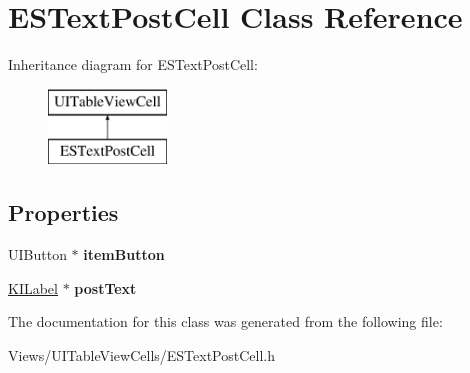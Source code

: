 \hypertarget{interface_e_s_text_post_cell}{}\section{E\+S\+Text\+Post\+Cell Class Reference}
\label{interface_e_s_text_post_cell}
Inheritance diagram for E\+S\+Text\+Post\+Cell\+:\begin{figure}[H]
\begin{center}
\leavevmode
\includegraphics[height=2.000000cm]{interface_e_s_text_post_cell}
\end{center}
\end{figure}
\subsection*{Properties}
\begin{DoxyCompactItemize}
\item 
\hypertarget{interface_e_s_text_post_cell_afe5d7274013d99748b5072233d75bac2}{}U\+I\+Button $\ast$ {\bfseries item\+Button}\label{interface_e_s_text_post_cell_afe5d7274013d99748b5072233d75bac2}

\item 
\hypertarget{interface_e_s_text_post_cell_a9f70d46d39ddce8d6a33037406de18d7}{}\hyperlink{interface_k_i_label}{K\+I\+Label} $\ast$ {\bfseries post\+Text}\label{interface_e_s_text_post_cell_a9f70d46d39ddce8d6a33037406de18d7}

\end{DoxyCompactItemize}


The documentation for this class was generated from the following file\+:\begin{DoxyCompactItemize}
\item 
Views/\+U\+I\+Table\+View\+Cells/E\+S\+Text\+Post\+Cell.\+h\end{DoxyCompactItemize}
